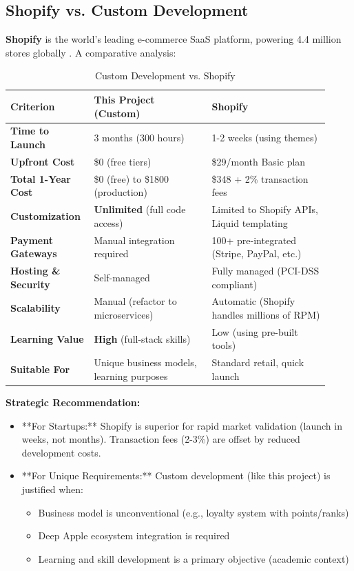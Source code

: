 \subsection{Shopify vs. Custom Development}

\textbf{Shopify} is the world's leading e-commerce SaaS platform, powering 4.4 million stores globally \cite{shopify2024}. A comparative analysis:

\begin{table}[H]
\centering
\caption{Custom Development vs. Shopify}
\label{tab:shopify_comparison}
\small
\begin{tabular}{@{}p{0.22\linewidth}p{0.35\linewidth}p{0.35\linewidth}@{}}
\toprule
\textbf{Criterion} & \textbf{This Project (Custom)} & \textbf{Shopify} \\
\midrule
\textbf{Time to Launch} & 3 months (300 hours) & 1-2 weeks (using themes) \\
\textbf{Upfront Cost} & \$0 (free tiers) & \$29/month Basic plan \\
\textbf{Total 1-Year Cost} & \$0 (free) to \$1800 (production) & \$348 + 2\% transaction fees \\
\textbf{Customization} & \textbf{Unlimited} (full code access) & Limited to Shopify APIs, Liquid templating \\
\textbf{Payment Gateways} & Manual integration required & 100+ pre-integrated (Stripe, PayPal, etc.) \\
\textbf{Hosting \& Security} & Self-managed & Fully managed (PCI-DSS compliant) \\
\textbf{Scalability} & Manual (refactor to microservices) & Automatic (Shopify handles millions of RPM) \\
\textbf{Learning Value} & \textbf{High} (full-stack skills) & Low (using pre-built tools) \\
\textbf{Suitable For} & Unique business models, learning purposes & Standard retail, quick launch \\
\bottomrule
\end{tabular}
\end{table}

\textbf{Strategic Recommendation:} 
\begin{itemize}
    \item **For Startups:** Shopify is superior for rapid market validation (launch in weeks, not months). Transaction fees (2-3\%) are offset by reduced development costs.
    \item **For Unique Requirements:** Custom development (like this project) is justified when:
    \begin{itemize}
        \item Business model is unconventional (e.g., loyalty system with points/ranks)
        \item Deep Apple ecosystem integration is required
        \item Learning and skill development is a primary objective (academic context)
    \end{itemize}
\end{itemize}

